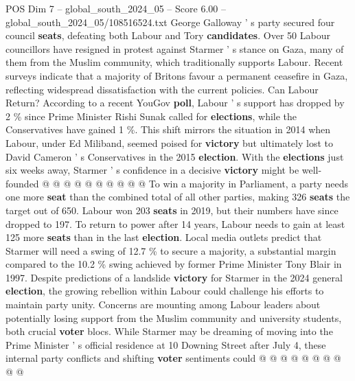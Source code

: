 \begin{textsample}{POS Dim 7 – global\_south\_2024\_05 – Score 6.00 – global\_south\_2024\_05/108516524.txt}
George Galloway ' s party secured four council \textbf{seats}, defeating both Labour and Tory \textbf{candidates}.
Over 50 Labour councillors have resigned in protest against Starmer ' s stance on Gaza, many of them from the Muslim community, which traditionally supports Labour.
Recent surveys indicate that a majority of Britons favour a permanent ceasefire in Gaza, reflecting widespread dissatisfaction with the current policies.
Can Labour Return?
According to a recent YouGov \textbf{poll}, Labour ' s support has dropped by 2 \% since Prime Minister Rishi Sunak called for \textbf{elections}, while the Conservatives have gained 1 \%.
This shift mirrors the situation in 2014 when Labour, under Ed Miliband, seemed poised for \textbf{victory} but ultimately lost to David Cameron ' s Conservatives in the 2015 \textbf{election}.
With the \textbf{elections} just six weeks away, Starmer ' s confidence in a decisive \textbf{victory} might be well-founded @ @ @ @ @ @ @ @ @ @ To win a majority in Parliament, a party needs one more \textbf{seat} than the combined total of all other parties, making 326 \textbf{seats} the target out of 650.
Labour won 203 \textbf{seats} in 2019, but their numbers have since dropped to 197.
To return to power after 14 years, Labour needs to gain at least 125 more \textbf{seats} than in the last \textbf{election}.
Local media outlets predict that Starmer will need a swing of 12.7 \% to secure a majority, a substantial margin compared to the 10.2 \% swing achieved by former Prime Minister Tony Blair in 1997.
Despite predictions of a landslide \textbf{victory} for Starmer in the 2024 general \textbf{election}, the growing rebellion within Labour could challenge his efforts to maintain party unity.
Concerns are mounting among Labour leaders about potentially losing support from the Muslim community and university students, both crucial \textbf{voter} blocs.
While Starmer may be dreaming of moving into the Prime Minister ' s official residence at 10 Downing Street after July 4, these internal party conflicts and shifting \textbf{voter} sentiments could @ @ @ @ @ @ @ @ @ @

\end{textsample}
